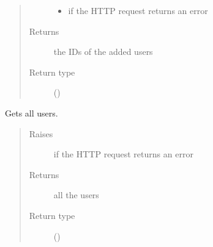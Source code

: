 \documentclass[letterpaper,10pt,english]{sphinxmanual}
\begin{document}
\begin{fulllineitems}
\begin{fulllineitems}
\begin{quote}
\begin{description}
\begin{itemize}
\item {} 
\sphinxAtStartPar
{\hyperref[\detokenize{autoapi/pine/client/exceptions/index:pine.client.exceptions.PineClientHttpException}]{}} \textendash{} if the HTTP request returns an error

\end{itemize}

\item[{Returns}] \leavevmode
\sphinxAtStartPar
the IDs of the added users

\item[{Return type}] \leavevmode
\sphinxAtStartPar
{}()

\end{description}\end{quote}

\end{fulllineitems}


\begin{fulllineitems}
\label{\detokenize{autoapi/pine/client/client/index:pine.client.client.EveClient.get_users}}
\sphinxAtStartPar
Gets all users.
\begin{quote}\begin{description}
\item[{Raises}] \leavevmode
\sphinxAtStartPar
{\hyperref[\detokenize{autoapi/pine/client/exceptions/index:pine.client.exceptions.PineClientHttpException}]{}} \textendash{} if the HTTP request returns an error

\item[{Returns}] \leavevmode
\sphinxAtStartPar
all the users

\item[{Return type}] \leavevmode
\sphinxAtStartPar
{}()

\end{description}\end{quote}


\end{fulllineitems}
\end{fulllineitems}
\end{document}

